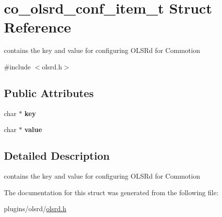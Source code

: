 \hypertarget{structco__olsrd__conf__item__t}{\section{co\+\_\+olsrd\+\_\+conf\+\_\+item\+\_\+t Struct Reference}
\label{structco__olsrd__conf__item__t}
}


contains the key and value for configuring O\+L\+S\+Rd for Commotion  




{\ttfamily \#include $<$olsrd.\+h$>$}

\subsection*{Public Attributes}
\begin{DoxyCompactItemize}
\item 
\hypertarget{structco__olsrd__conf__item__t_aff34314213116882c2ca1151b6ed5f1d}{char $\ast$ {\bfseries key}}\label{structco__olsrd__conf__item__t_aff34314213116882c2ca1151b6ed5f1d}

\item 
\hypertarget{structco__olsrd__conf__item__t_a76ad082980a4dcd32235c0738ac431e2}{char $\ast$ {\bfseries value}}\label{structco__olsrd__conf__item__t_a76ad082980a4dcd32235c0738ac431e2}

\end{DoxyCompactItemize}


\subsection{Detailed Description}
contains the key and value for configuring O\+L\+S\+Rd for Commotion 

The documentation for this struct was generated from the following file\+:\begin{DoxyCompactItemize}
\item 
plugins/olsrd/\hyperlink{olsrd_8h}{olsrd.\+h}\end{DoxyCompactItemize}
